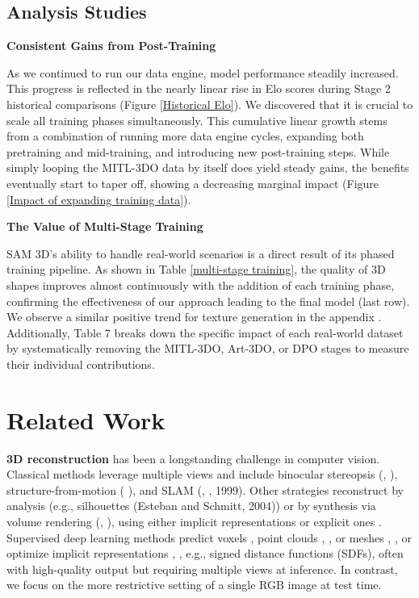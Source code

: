 \documentclass[manuscript,review]{acmart}
\begin{document}
\subsection{Analysis Studies}

\textbf{Consistent Gains from Post-Training}

As we continued to run our data engine, model performance steadily increased. This progress is reflected in the nearly linear rise in Elo scores during Stage 2 historical comparisons (Figure \ref{Historical Elo}). We discovered that it is crucial to scale all training phases simultaneously. This cumulative linear growth stems from a combination of running more data engine cycles, expanding both pretraining and mid-training, and introducing new post-training steps. While simply looping the MITL-3DO data by itself does yield steady gains, the benefits eventually start to taper off, showing a decreasing marginal impact (Figure \ref{Impact of expanding training data}).

\textbf{The Value of Multi-Stage Training}

SAM 3D's ability to handle real-world scenarios is a direct result of its phased training pipeline. As shown in Table \ref{multi-stage training}, the quality of 3D shapes improves almost continuously with the addition of each training phase, confirming the effectiveness of our approach leading to the final model (last row). We observe a similar positive trend for texture generation in the appendix . Additionally, Table 7 breaks down the specific impact of each real-world dataset by systematically removing the MITL-3DO, Art-3DO, or DPO stages to measure their individual contributions.



\section{Related Work}

\textbf{3D reconstruction} has been a longstanding challenge in computer vision. Classical methods leverage multiple views and include binocular stereopsis (\citet{wheatstone1838xviii}, \citeyear{wheatstone1838xviii}), structure-from-motion ( \citep{hartley2003multiple, szeliski2022computer, torresani2008nonrigid, tomasi1992shape}), and SLAM (\citet{smith1990estimating}, \citet{smith1990estimating}\; \citet{castellanos1999spmap}, 1999). Other strategies reconstruct by analysis (e.g., silhouettes (Esteban and Schmitt, 2004)) or by synthesis via volume rendering (\citet{kajiya1984ray}, \citeyear{kajiya1984ray}), using either implicit representations \citep{mo2025midtraininglargelanguagemodels} or explicit ones \citep{sitzmann2019deepvoxels, liu2020neural}. Supervised deep learning methods predict voxels \citep{xie2019pix2vox, wang2021multi} , point clouds \citet{van2022revealing}, \citeyear{van2022revealing}, or meshes \citet{worchel2022multi}, \citeyear{worchel2022multi}, or optimize implicit representations \citet{liu2022flow}, \citeyear{liu2022flow}, e.g., signed distance functions (SDFs), often with high-quality output but requiring multiple views at inference. In contrast, we focus on the more restrictive setting of a single RGB image at test time.
\end{document}
